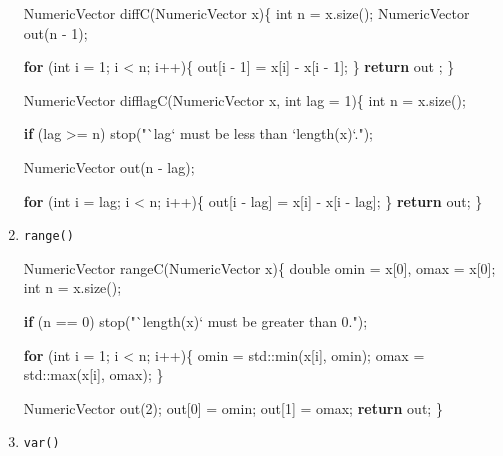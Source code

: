 \documentclass[
]{krantz}
\makeatletter
\newenvironment{Shaded}{\begin{snugshade}}{\end{snugshade}}
\newcommand{\BuiltInTok}[1]{#1}
\newcommand{\ControlFlowTok}[1]{\textcolor[rgb]{0.13,0.29,0.53}{\textbf{#1}}}
\newcommand{\DataTypeTok}[1]{\textcolor[rgb]{0.13,0.29,0.53}{#1}}
\newcommand{\DecValTok}[1]{\textcolor[rgb]{0.00,0.00,0.81}{#1}}
\newcommand{\NormalTok}[1]{#1}
\newcommand{\StringTok}[1]{\textcolor[rgb]{0.31,0.60,0.02}{#1}}
\newenvironment{kframe}{%
\medskip{}
\setlength{\fboxsep}{.8em}
 \def\at@end@of@kframe{}%
 \ifinner\ifhmode%
  \def\at@end@of@kframe{\end{minipage}}%
  \begin{minipage}{\columnwidth}%
 \fi\fi%
 \def\FrameCommand##1{\hskip\@totalleftmargin \hskip-\fboxsep
 \colorbox{shadecolor}{##1}\hskip-\fboxsep
     \hskip-\linewidth \hskip-\@totalleftmargin \hskip\columnwidth}%
 \MakeFramed {\advance\hsize-\width
   \@totalleftmargin\z@ \linewidth\hsize
   \@setminipage}}%
 {\par\unskip\endMakeFramed%
 \at@end@of@kframe}
\renewenvironment{Shaded}{\begin{kframe}}{\end{kframe}}
\renewcommand{\DataTypeTok}[1]{\textcolor[rgb]{0.56,0.13,0.00}{{#1}}}
\renewcommand{\DecValTok}  [1]{\textcolor[rgb]{0.25,0.63,0.44}{{#1}}}
\renewcommand{\StringTok}  [1]{\textcolor[rgb]{0.25,0.44,0.63}{{#1}}}
\renewcommand{\NormalTok}  [1]{{#1}}
\makeatother
\begin{document}
\begin{enumerate}
\begin{Shaded}
\begin{Highlighting}[]
\NormalTok{NumericVector diffC(NumericVector x)\{}
  \DataTypeTok{int}\NormalTok{ n = x.size();}
\NormalTok{  NumericVector out(n - }\DecValTok{1}\NormalTok{);}

  \ControlFlowTok{for}\NormalTok{ (}\DataTypeTok{int}\NormalTok{ i = }\DecValTok{1}\NormalTok{; i < n; i++)\{}
\NormalTok{    out[i - }\DecValTok{1}\NormalTok{] = x[i] - x[i - }\DecValTok{1}\NormalTok{];}
\NormalTok{  \}}
  \ControlFlowTok{return}\NormalTok{ out ;}
\NormalTok{\}}

\NormalTok{NumericVector difflagC(NumericVector x, }\DataTypeTok{int}\NormalTok{ lag = }\DecValTok{1}\NormalTok{)\{}
  \DataTypeTok{int}\NormalTok{ n = x.size();}

  \ControlFlowTok{if}\NormalTok{ (lag >= n) stop(}\StringTok{"`lag` must be less than `length(x)`."}\NormalTok{);}

\NormalTok{  NumericVector out(n - lag);}

  \ControlFlowTok{for}\NormalTok{ (}\DataTypeTok{int}\NormalTok{ i = lag; i < n; i++)\{}
\NormalTok{    out[i - lag] = x[i] - x[i - lag];}
\NormalTok{  \}}
  \ControlFlowTok{return}\NormalTok{ out;}
\NormalTok{\}}
\end{Highlighting}
\end{Shaded}
\item
  \texttt{range()}

\begin{Shaded}
\begin{Highlighting}[]
\NormalTok{NumericVector rangeC(NumericVector x)\{}
  \DataTypeTok{double}\NormalTok{ omin = x[}\DecValTok{0}\NormalTok{], omax = x[}\DecValTok{0}\NormalTok{];}
  \DataTypeTok{int}\NormalTok{ n = x.size();}

  \ControlFlowTok{if}\NormalTok{ (n == }\DecValTok{0}\NormalTok{) stop(}\StringTok{"`length(x)` must be greater than 0."}\NormalTok{);}

  \ControlFlowTok{for}\NormalTok{ (}\DataTypeTok{int}\NormalTok{ i = }\DecValTok{1}\NormalTok{; i < n; i++)\{}
\NormalTok{    omin = }\BuiltInTok{std::}\NormalTok{min(x[i], omin);}
\NormalTok{    omax = }\BuiltInTok{std::}\NormalTok{max(x[i], omax);}
\NormalTok{  \}}

\NormalTok{  NumericVector out(}\DecValTok{2}\NormalTok{);}
\NormalTok{  out[}\DecValTok{0}\NormalTok{] = omin;}
\NormalTok{  out[}\DecValTok{1}\NormalTok{] = omax;}
  \ControlFlowTok{return}\NormalTok{ out;}
\NormalTok{\}}
\end{Highlighting}
\end{Shaded}
\item
  \texttt{var()}


\end{enumerate}
\end{document}
